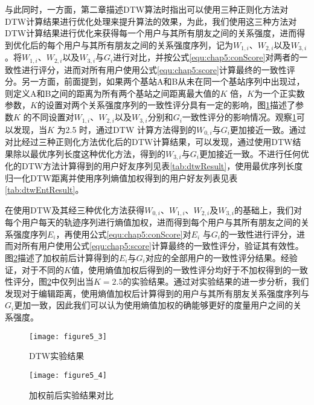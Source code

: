 与此同时，一方面，第二章描述DTW算法时指出可以使用三种正则化方法对DTW计算结果进行优化处理来提升算法的效果，为此，我们使用这三种方法对DTW计算结果进行优化来获得每一个用户与其所有朋友之间的关系强度，进而得到优化后的每个用户与其所有朋友之间的关系强度序列，记为$W_{1,i}$、$W_{2,i}$以及$W_{3,i}$。将$W_{1,i}$、$W_{2,i}$以及$W_{3,i}$与$G_{i}$进行对比，并按公式\ref{equ:chap5:conScore}对两者的一致性进行评分，进而对所有用户使用公式\ref{equ:chap5:score}计算最终的一致性评分。另一方面，前面提到，如果两个基站A和B从未在同一个基站序列中出现过，则定义A和B之间的距离为所有两个基站之间距离最大值的$K$ 倍，$K$为一个正实数参数，$K$的设置对两个关系强度序列的一致性评分具有一定的影响，图\ref{fig:5_3}描述了参数$K$ 的不同设置对$W_{1,i}$、$W_{2,i}$以及$W_{3,i}$分别和$G_{i}$一致性评分的影响情况。观察\ref{fig:5_3}可以发现，当$K$ 为2.5 时，通过DTW 计算方法得到的$W_{0,i}$与$G_{i}$更加接近一致。通过对比经过三种正则化方法优化后的DTW计算结果，可以发现，通过使用DTW结果除以最优序列长度这种优化方法，得到的$W_{3,i}$与$G_{i}$更加接近一致。不进行任何优化的DTW方法计算得到的用户好友序列见表\ref{tab:dtwResult}，使用最优序列长度归一化DTW距离并使用序列熵值加权得到的用户好友列表见表\ref{tab:dtwEntResult}。
\par 在使用DTW及其经三种优化方法获得$W_{0,i}$、$W_{1,i}$、$W_{2,i}$及$W_{3,i}$的基础上，我们对每个用户每天的轨迹序列进行熵值加权，进而得到每个用户与其所有朋友之间的关系强度序列$E_{i}$，再使用公式\ref{equ:chap5:conScore}对$E_{i}$ 与$G_{i}$的一致性进行评分，进而对所有用户使用公式\ref{equ:chap5:score}计算最终的一致性评分，验证其有效性。图\ref{fig:5_4}描述了加权前后计算得到的$E_{i}$与$G_{i}$对应的全部用户的一致性评分结果。经验证，对于不同的$K$值，使用熵值加权后得到的一致性评分均好于不加权得到的一致性评分，图\ref{fig:5_4}中仅列出当$K=2.5$的实验结果。通过对实验结果的进一步分析，我们发现对于编辑距离，使用熵值加权后计算得到的用户与其所有朋友关系强度序列与$G_{i}$更加一致，因此我们可以认为使用熵值加权的确能够更好的度量用户之间的关系强度。
\begin{figure}[htp]
\centering
\texttt{[image: figure5\_3]}
\caption{DTW实验结果}
\label{fig:5_3}
\end{figure}
\begin{figure}[htp]
\centering
\texttt{[image: figure5\_4]}
\caption{加权前后实验结果对比}
\label{fig:5_4}
\end{figure}
